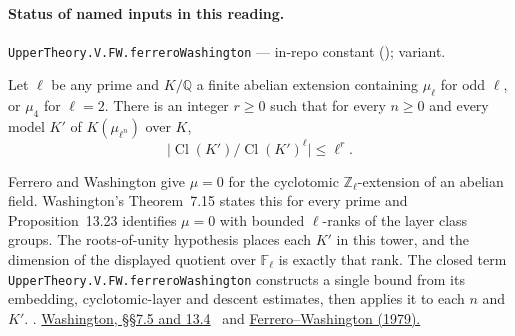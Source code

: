 

\paragraph{Status of named inputs in this reading.}
\noindent\nolinkurl{UpperTheory.V.FW.ferreroWashington} --- in-repo constant (); variant.\par

\begin{formalstatement}\label{sub:W11}
Let $\ell$ be any prime and $K/\mathbb Q$ a finite abelian extension
containing $\mu_\ell$ for odd $\ell$, or $\mu_4$ for $\ell=2$. There
is an integer $r\ge0$ such that for every $n\ge0$ and every model
$K'$ of $K(\mu_{\ell^n})$ over $K$,
\[
    \big|\operatorname{Cl}(K')/\operatorname{Cl}(K')^\ell\big|\le\ell^r .
\]
\end{formalstatement}
Ferrero and Washington give $\mu=0$ for the cyclotomic
$\mathbb Z_\ell$-extension of an abelian field. Washington's
Theorem~7.15 states this for every prime and Proposition~13.23 identifies
$\mu=0$ with bounded $\ell$-ranks of the layer class groups. The
roots-of-unity hypothesis places each $K'$ in this tower, and the
dimension of the displayed quotient over $\mathbb F_\ell$ is exactly
that rank. The closed term \nolinkurl{UpperTheory.V.FW.ferreroWashington}
constructs a single bound from its embedding, cyclotomic-layer and descent
estimates, then applies it to each $n$ and $K'$.
.
\href{https://doi.org/10.1007/978-1-4612-1934-7}{Washington, §§7.5 and 13.4}~\cite{r21-washington} and
\href{https://doi.org/10.2307/1971116}{Ferrero--Washington (1979).}~\cite{r21-fw}
